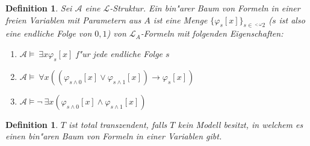 \documentclass[a4paper,12pt,numbers=noenddot,parskip=full]{scrartcl}
\newcommand{\Forall}{~\forall}
\newcommand{\Exists}{~\exists}
\newcommand{\scrL}{\mathcal{L}}
\newcommand{\scrA}{\mathcal{A}}
\theoremstyle{dotless}
\newtheorem{definition}[theorem]{Definition}
\begin{document}
\begin{definition}
	Sei $\scrA$ eine $\scrL$-Struktur. Ein bin"arer Baum von Formeln in einer freien Variablen mit Parametern aus $A$ ist eine Menge $\{\varphi_s [x]\}_{s \in \phantom{}^{<\omega}2}$ ($s$ ist also eine endliche Folge von $0,1$) von $\scrL_A$-Formeln mit folgenden Eigenschaften:
	\begin{enumerate}
		\item $\scrA \models \Exists x \varphi_s[x]$ f"ur jede endliche Folge $s$
		\item $\scrA \models \Forall x ((\varphi_{s \land 0}[x] \lor \varphi_{s \land 1}[x])\rightarrow \varphi_s[x])$
		\item $\scrA \models \lnot \Exists x (\varphi_{s \land 0}[x] \land \varphi_{s \land 1}[x])$
	\end{enumerate}
\end{definition}
\begin{definition}
	$T$ ist \emph{total transzendent}, falls $T$ kein Modell besitzt, in welchem es einen bin"aren Baum von Formeln in einer Variablen gibt.
\end{definition}
\newpage
\end{document}
